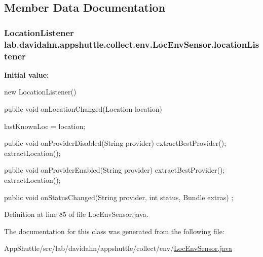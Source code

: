 \subsection{\-Member \-Data \-Documentation}
\hypertarget{classlab_1_1davidahn_1_1appshuttle_1_1collect_1_1env_1_1_loc_env_sensor_a146a3b0d9a21c4dcf30a54f9b02bbdf6}{
\subsubsection[{location\-Listener}]{\setlength{\rightskip}{0pt plus 5cm}\-Location\-Listener {\bf lab.\-davidahn.\-appshuttle.\-collect.\-env.\-Loc\-Env\-Sensor.\-location\-Listener}}}\label{classlab_1_1davidahn_1_1appshuttle_1_1collect_1_1env_1_1_loc_env_sensor_a146a3b0d9a21c4dcf30a54f9b02bbdf6}
{\bfseries \-Initial value\-:}
\begin{DoxyCode}
 new LocationListener() {
                public void onLocationChanged(Location location) {

                        lastKnownLoc = location;
                }

                public void onProviderDisabled(String provider) {
                        extractBestProvider();
                        extractLocation();
                }

                public void onProviderEnabled(String provider) {
                        extractBestProvider();
                        extractLocation();
                }

                public void onStatusChanged(String provider, int status, Bundle
       extras) {
                        ;
                }
        }
\end{DoxyCode}


\-Definition at line 85 of file \-Loc\-Env\-Sensor.\-java.



\-The documentation for this class was generated from the following file\-:\begin{DoxyCompactItemize}
\item 
\-App\-Shuttle/src/lab/davidahn/appshuttle/collect/env/\hyperlink{_loc_env_sensor_8java}{\-Loc\-Env\-Sensor.\-java}\end{DoxyCompactItemize}
